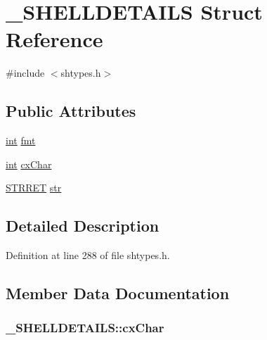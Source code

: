 \hypertarget{struct___s_h_e_l_l_d_e_t_a_i_l_s}{}\section{\+\_\+\+S\+H\+E\+L\+L\+D\+E\+T\+A\+I\+LS Struct Reference}
\label{struct___s_h_e_l_l_d_e_t_a_i_l_s}


{\ttfamily \#include $<$shtypes.\+h$>$}

\subsection*{Public Attributes}
\begin{DoxyCompactItemize}
\item 
\hyperlink{xmltok_8h_a5a0d4a5641ce434f1d23533f2b2e6653}{int} \hyperlink{struct___s_h_e_l_l_d_e_t_a_i_l_s_a5592a7ce2a87649073a753e3fb805962}{fmt}
\item 
\hyperlink{xmltok_8h_a5a0d4a5641ce434f1d23533f2b2e6653}{int} \hyperlink{struct___s_h_e_l_l_d_e_t_a_i_l_s_a1bf85653da25c82e12314f61a12cf8d8}{cx\+Char}
\item 
\hyperlink{shtypes_8h_a000a2f7d3c1a5ce00f6463d0ce5f3777}{S\+T\+R\+R\+ET} \hyperlink{struct___s_h_e_l_l_d_e_t_a_i_l_s_a36f0e90966ad2af76f2f4d8c2991bfe4}{str}
\end{DoxyCompactItemize}


\subsection{Detailed Description}


Definition at line 288 of file shtypes.\+h.



\subsection{Member Data Documentation}
\subsubsection[{\texorpdfstring{cx\+Char}{cxChar}}]{ \+\_\+\+S\+H\+E\+L\+L\+D\+E\+T\+A\+I\+L\+S\+::cx\+Char}\hypertarget{struct___s_h_e_l_l_d_e_t_a_i_l_s_a1bf85653da25c82e12314f61a12cf8d8}{}\label{struct___s_h_e_l_l_d_e_t_a_i_l_s_a1bf85653da25c82e12314f61a12cf8d8}


